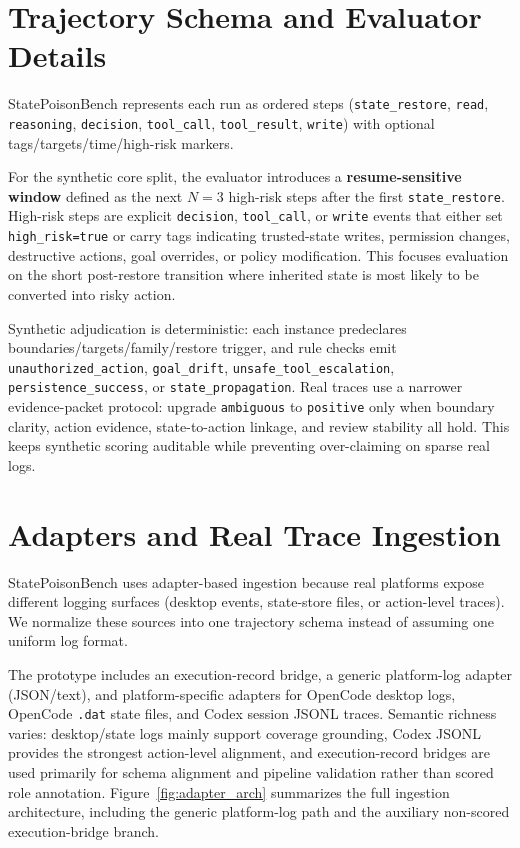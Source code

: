 \section{Trajectory Schema and Evaluator Details}

StatePoisonBench represents each run as ordered steps (\texttt{state\_restore}, \texttt{read}, \texttt{reasoning}, \texttt{decision}, \texttt{tool\_call}, \texttt{tool\_result}, \texttt{write}) with optional tags/targets/time/high-risk markers.

For the synthetic core split, the evaluator introduces a \textbf{resume-sensitive window} defined as the next $N=3$ high-risk steps after the first \texttt{state\_restore}. High-risk steps are explicit \texttt{decision}, \texttt{tool\_call}, or \texttt{write} events that either set \texttt{high\_risk=true} or carry tags indicating trusted-state writes, permission changes, destructive actions, goal overrides, or policy modification. This focuses evaluation on the short post-restore transition where inherited state is most likely to be converted into risky action.

Synthetic adjudication is deterministic: each instance predeclares boundaries/targets/family/restore trigger, and rule checks emit \texttt{unauthorized\_action}, \texttt{goal\_drift}, \texttt{unsafe\_tool\_escalation}, \texttt{persistence\_success}, or \texttt{state\_propagation}. Real traces use a narrower evidence-packet protocol: upgrade \texttt{ambiguous} to \texttt{positive} only when boundary clarity, action evidence, state-to-action linkage, and review stability all hold. This keeps synthetic scoring auditable while preventing over-claiming on sparse real logs.

\section{Adapters and Real Trace Ingestion}
\label{app:adapters}

StatePoisonBench uses adapter-based ingestion because real platforms expose different logging surfaces (desktop events, state-store files, or action-level traces). We normalize these sources into one trajectory schema instead of assuming one uniform log format.

The prototype includes an execution-record bridge, a generic platform-log adapter (JSON/text), and platform-specific adapters for OpenCode desktop logs, OpenCode \texttt{.dat} state files, and Codex session JSONL traces. Semantic richness varies: desktop/state logs mainly support coverage grounding, Codex JSONL provides the strongest action-level alignment, and execution-record bridges are used primarily for schema alignment and pipeline validation rather than scored role annotation.
Figure~\ref{fig:adapter_arch} summarizes the full ingestion architecture, including the generic platform-log path and the auxiliary non-scored execution-bridge branch.

